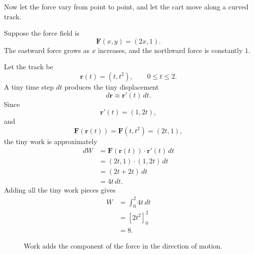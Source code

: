 Now let the force vary from point to point, and let the cart move along a curved track.

Suppose the force field is
\[
    \mathbf F(x,y)=(2x,1).
\]
The eastward force grows as \(x\) increases, and the northward force is constantly \(1\).

Let the track be
\[
    \mathbf r(t)=(t,t^2),
    \qquad
    0\le t\le2.
\]
A tiny time step \(dt\) produces the tiny displacement
\[
    d\mathbf r\approx \mathbf r'(t)\,dt.
\]
Since
\[
    \mathbf r'(t)=(1,2t),
\]
and
\[
    \mathbf F(\mathbf r(t))=\mathbf F(t,t^2)=(2t,1),
\]
the tiny work is approximately
\[
\begin{aligned}
dW
&=
\mathbf F(\mathbf r(t))\cdot \mathbf r'(t)\,dt\\
&=
(2t,1)\cdot(1,2t)\,dt\\
&=
(2t+2t)\,dt\\
&=
4t\,dt.
\end{aligned}
\]
Adding all the tiny work pieces gives
\[
\begin{aligned}
W
&=
\int_0^2 4t\,dt\\
&=
\left[2t^2\right]_0^2\\
&=
8.
\end{aligned}
\]

\begin{figure}[h]
\centering
{}
\caption{Work adds the component of the force in the direction of motion.}
\end{figure}

